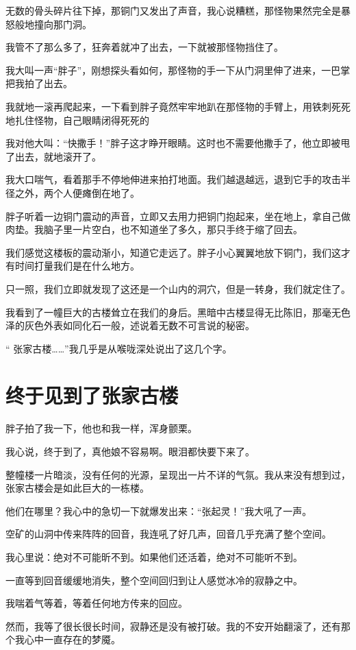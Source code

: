 无数的骨头碎片往下掉，那铜门又发出了声音，我心说糟糕，那怪物果然完全是暴怒般地撞向那门洞。

我管不了那么多了，狂奔着就冲了出去，一下就被那怪物挡住了。

我大叫一声“胖子”，刚想探头看如何，那怪物的手一下从门洞里伸了进来，一巴掌把我拍了出去。

我就地一滚再爬起来，一下看到胖子竟然牢牢地趴在那怪物的手臂上，用铁刺死死地扎住怪物，自己眼睛闭得死死的

我对他大叫：“快撒手！”胖子这才睁开眼睛。这时也不需要他撒手了，他立即被甩了出去，就地滚开了。

我大口喘气，看着那手不停地伸进来拍打地面。我们越退越远，退到它手的攻击半径之外，两个人便瘫倒在地了。

胖子听着一边铜门震动的声音，立即又去用力把铜门抱起来，坐在地上，拿自己做肉垫。我脑子里一片空白，也不知道坐了多久，那只手终于缩了回去。

我们感觉这楼板的震动渐小，知道它走远了。胖子小心翼翼地放下铜门，我们这才有时间打量我们是在什么地方。

只一照，我们立即就发现了这还是一个山内的洞穴，但是一转身，我们就定住了。

我看到了一幢巨大的古楼耸立在我们的身后。黑暗中古楼显得无比陈旧，那毫无色泽的灰色外表如同化石一般，述说着无数不可言说的秘密。

“ 张家古楼……”我几乎是从喉咙深处说出了这几个字。

\chapter{终于见到了张家古楼}

胖子拍了我一下，他也和我一样，浑身颤栗。

我心说，终于到了，真他娘不容易啊。眼泪都快要下来了。

整幢楼一片暗淡，没有任何的光源，呈现出一片不详的气氛。我从来没有想到过，张家古楼会是如此巨大的一栋楼。

他们在哪里？我心中的急切一下就爆发出来：“张起灵！”我大吼了一声。

空矿的山洞中传来阵阵的回音，我连吼了好几声，回音几乎充满了整个空间。

我心里说：绝对不可能昕不到。如果他们还活着，绝对不可能听不到。

一直等到回音缓缓地消失，整个空间回归到让人感觉冰冷的寂静之中。

我喘着气等着，等着任何地方传来的回应。

然而，我等了很长很长时间，寂静还是没有被打破。我的不安开始翻滚了，还有那个我心中一直存在的梦魇。

